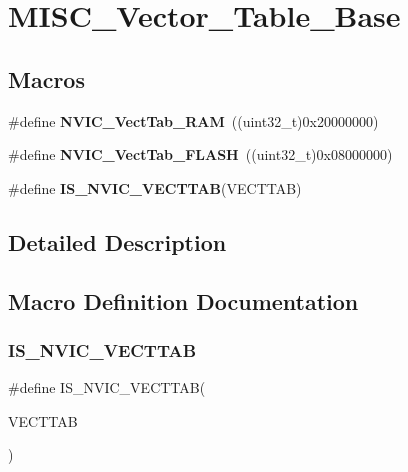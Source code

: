 \section{M\+I\+S\+C\+\_\+\+Vector\+\_\+\+Table\+\_\+\+Base}
\label{group__MISC__Vector__Table__Base}
\subsection*{Macros}
\begin{DoxyCompactItemize}
\item 
\#define \textbf{ N\+V\+I\+C\+\_\+\+Vect\+Tab\+\_\+\+R\+AM}~((uint32\+\_\+t)0x20000000)
\item 
\#define \textbf{ N\+V\+I\+C\+\_\+\+Vect\+Tab\+\_\+\+F\+L\+A\+SH}~((uint32\+\_\+t)0x08000000)
\item 
\#define \textbf{ I\+S\+\_\+\+N\+V\+I\+C\+\_\+\+V\+E\+C\+T\+T\+AB}(V\+E\+C\+T\+T\+AB)
\end{DoxyCompactItemize}


\subsection{Detailed Description}


\subsection{Macro Definition Documentation}
\mbox{\label{group__MISC__Vector__Table__Base_ga26b9d493ccb98fcce9a27303078940c8}} 
\subsubsection{I\+S\+\_\+\+N\+V\+I\+C\+\_\+\+V\+E\+C\+T\+T\+AB}
{\footnotesize\ttfamily \#define I\+S\+\_\+\+N\+V\+I\+C\+\_\+\+V\+E\+C\+T\+T\+AB(\begin{DoxyParamCaption}\item[{}]{V\+E\+C\+T\+T\+AB }\end{DoxyParamCaption})}

